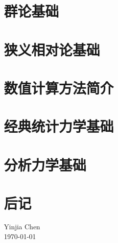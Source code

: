 \documentclass[cn,11pt,chinese,toc= twocol]{elegantbook}
\begin{document}
\chapter{群论基础}
    
    
\chapter{狭义相对论基础}
    
    
\chapter{数值计算方法简介}
    
    
\chapter{经典统计力学基础}   
    

\chapter{分析力学基础}
    
    
\nocite{*} 

\chapter*{后记}

\vskip 1.5cm

\begin{flushright}
Yinjia Chen\\
\today
\end{flushright}
\end{document}
